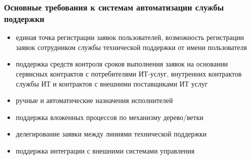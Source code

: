 \documentclass{../industrial-development}
\begin{document}
\begin{frame} \frametitle{Основные требования к системам автоматизации службы поддержки}
	\begin{itemize} 
		\item единая точка регистрации заявок пользователей, возможность регистрации заявок сотрудником службы технической поддержки от имени пользователя
		\item поддержка средств контроля сроков выполнения заявок на основании сервисных контрактов с потребителями ИТ-услуг, внутренних контрактов службы ИТ и контрактов с внешними поставщиками ИТ услуг
		\item ручные и автоматические назначения исполнителей
		\item поддержка вложенных процессов по механизму дерево/ветки
		\item делегирование заявки между линиями технической поддержки
		\item поддержка интеграции с внешними системами управления
	\end{itemize}
\end{frame}
\lecturenotes
\end{document}
